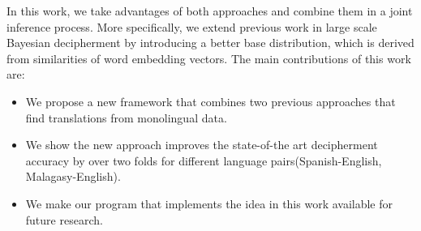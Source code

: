 In this work, we take advantages of both approaches and combine them in a joint inference process. More specifically, we extend previous work in large scale Bayesian decipherment by introducing a better base distribution, which is derived from similarities of word embedding vectors. The main contributions of this work are:

\begin{itemize}
\item We propose a new framework that combines two previous approaches that find translations from monolingual data.

\item We show the new approach improves the state-of-the art decipherment accuracy by over two folds for different language pairs(Spanish-English, Malagasy-English). 

\item We make our program that implements the idea in this work available for future research.
\end{itemize}